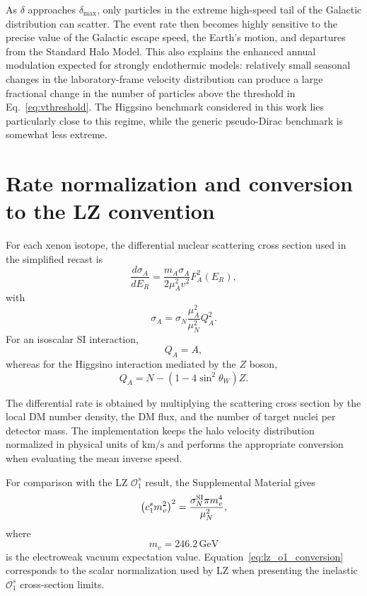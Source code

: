 \documentclass[aps,prd,reprint,superscriptaddress,nofootinbib,longbibliography,floatfix]{revtex4-2}
\newcommand{\GeV}{\mathrm{GeV}}
\begin{document}
As $\delta$ approaches $\delta_{\max}$, only particles in the extreme high-speed tail of the Galactic distribution can scatter. The event rate then becomes highly sensitive to the precise value of the Galactic escape speed, the Earth's motion, and departures from the Standard Halo Model. This also explains the enhanced annual modulation expected for strongly endothermic models: relatively small seasonal changes in the laboratory-frame velocity distribution can produce a large fractional change in the number of particles above the threshold in Eq.~\eqref{eq:vthreshold}. The Higgsino benchmark considered in this work lies particularly close to this regime, while the generic pseudo-Dirac benchmark is somewhat less extreme.

\section{Rate normalization and conversion to the LZ convention}
\label{app:rate}

For each xenon isotope, the differential nuclear scattering cross section used in the simplified recast is
\begin{equation}
\frac{d\sigma_A}{dE_R}
=
\frac{m_A\sigma_A}
{2\mu_A^2v^2}
F_A^2(E_R),
\end{equation}
with
\begin{equation}
\sigma_A
=
\sigma_N
\frac{\mu_A^2}{\mu_N^2}
Q_A^2.
\end{equation}
For an isoscalar SI interaction,
\begin{equation}
Q_A=A,
\end{equation}
whereas for the Higgsino interaction mediated by the $Z$ boson,
\begin{equation}
Q_A
=
N-
\left(
1-4\sin^2\theta_W
\right)Z.
\end{equation}

The differential rate is obtained by multiplying the scattering cross section by the local DM number density, the DM flux, and the number of target nuclei per detector mass. The implementation keeps the halo velocity distribution normalized in physical units of $\mathrm{km/s}$ and performs the appropriate conversion when evaluating the mean inverse speed.

For comparison with the LZ $\mathcal{O}_1^s$ result, the Supplemental Material gives
\begin{equation}
\left(
c_1^s m_v^2
\right)^2
=
\frac{
\sigma_N^{\rm SI}
\pi m_v^4
}{
\mu_N^2
},
\label{eq:lz_o1_conversion}
\end{equation}
where
\begin{equation}
m_v=246.2\,\GeV
\end{equation}
is the electroweak vacuum expectation value. Equation~\eqref{eq:lz_o1_conversion} corresponds to the scalar normalization used by LZ when presenting the inelastic $\mathcal{O}_1^s$ cross-section limits.
\end{document}
